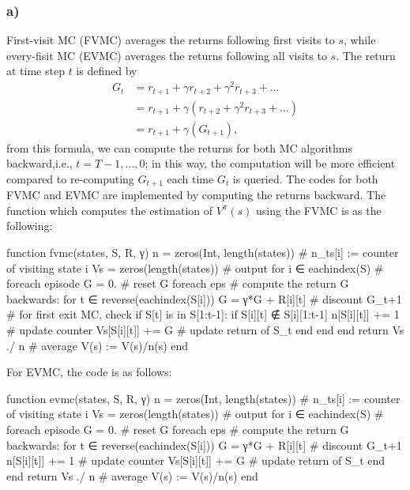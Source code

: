 \documentclass[12pt]{article}
\begin{document}
\subsubsection*{a)}
First-visit MC (FVMC) averages the returns following first visits to $s$, while every-fisit MC (EVMC) averages the returns following all visits to $s$. The return at time step $t$ is defined by
\begin{equation}
    \begin{split}
        G_t &= r_{t+1} + \gamma r_{t+2} + \gamma^2 r_{t+3} + ... \\
            &= r_{t+1} +\gamma(r_{t+2} + \gamma^2 r_{t+3} + ...) \\
            &= r_{t+1} +\gamma(G_{t+1}),
    \end{split}
\end{equation}
from this formula, we can compute the returns for both MC algorithms backward,i.e., $t=T-1,...,0$; in this way, the computation will be more efficient compared to re-computing $G_{t+1}$ each time $G_{t}$ is queried. 
The codes for both FVMC and EVMC are implemented by computing the returns backward. 
The function which computes the estimation of $V^{\pi}(s)$ using the FVMC is as the following:
\begin{jllisting}
    function fvmc(states, S, R, γ)
        n = zeros(Int, length(states)) # n_ts[i] := counter of visiting state i
        Vs = zeros(length(states)) # output
        for i ∈ eachindex(S) # foreach episode
            G = 0. # reset G foreach eps
            # compute the return G backwards:
            for t ∈ reverse(eachindex(S[i]))
                G = γ*G + R[i][t] # discount G_{t+1}
                # for first exit MC, check if S[t] is in S[1:t-1]:
                if S[i][t] ∉ S[i][1:t-1]
                    n[S[i][t]] += 1 # update counter
                    Vs[S[i][t]] += G # update return of S_t
                end
            end
        end
        return Vs ./ n # average V(s) := V(s)/n(s)
    end
\end{jllisting}
For EVMC, the code is as follows:
\begin{jllisting}
    function evmc(states, S, R, γ)
        n = zeros(Int, length(states)) # n_ts[i] := counter of visiting state i
        Vs = zeros(length(states)) # output
        for i ∈ eachindex(S) # foreach episode
            G = 0. # reset G foreach eps
            # compute the return G backwards:
            for t ∈ reverse(eachindex(S[i]))
                G = γ*G + R[i][t] # discount G_{t+1}
                n[S[i][t]] += 1 # update counter
                Vs[S[i][t]] += G # update return of S_t
            end
        end
        return Vs ./ n # average V(s) := V(s)/n(s)
    end
\end{jllisting}
\end{document}
